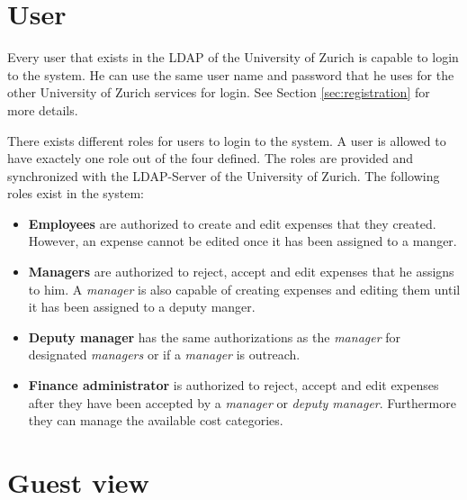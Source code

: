 \section{User}

Every user that exists in the LDAP of the University of Zurich is capable to login to the system. He can use the same user name and password that he uses for the other University of Zurich services for login. See Section \ref{sec:registration} for more details.  

There exists different roles for users to login to the system. A user is allowed to have exactely one role out of the four defined. The roles are provided and synchronized with the LDAP-Server of the University of Zurich. The following roles exist in the system:

\begin{itemize}
    \item \textbf{Employees} are authorized to create and edit expenses that they created. However, an expense cannot be edited once it has been assigned to a manger.
    \item \textbf{Managers} are authorized to reject, accept and edit expenses that he assigns to him. A \textit{manager} is also capable of creating expenses and editing them until it has been assigned to a deputy manger.
    \item \textbf{Deputy manager} has the same authorizations as the \textit{manager} for designated \textit{managers} or if a \textit{manager} is outreach.   
    \item \textbf{Finance administrator} is authorized to reject, accept and edit expenses after they have been accepted by a \textit{manager} or \textit{deputy manager}. Furthermore they can manage the available cost categories.
\end{itemize}

\section{Guest view}

